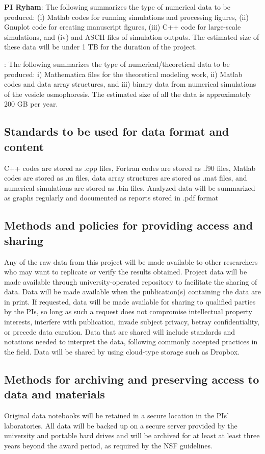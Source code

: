 \documentclass[11pt]{article}
\begin{document}
\noindent
{\bf PI Ryham}: The following summarizes the type of numerical data to
be produced: (i) Matlab codes for running simulations and processing
figures, (ii) Gnuplot code for creating manuscript figures, (iii) C++
code for large-scale simulations, and (iv) and ASCII files of simulation
outputs. The estimated size of these data will be under 1 TB for the
duration of the project.

: The following summarizes the type of
numerical/theoretical data to be produced: i) Mathematica files for the
theoretical modeling work, ii) Matlab codes and data array structures,
and iii) binary data from numerical simulations of the vesicle
osmophoresis. The estimated size of all the data is approximately 200 GB
per year. 

\subsection*{Standards to be used for data format and content}
C++ codes are stored as .cpp files, Fortran codes are stored as .f90
files, Matlab codes are stored as .m files, data array structures are
stored as .mat files, and numerical simulations are stored as .bin
files. Analyzed data will be summarized as graphs regularly and
documented as reports stored in .pdf format 

\subsection*{Methods and policies for providing access and sharing}
Any of the raw data from this project will be made available to other
researchers who may want to replicate or verify the results obtained.
Project data will be made available through university-operated
repository to facilitate the sharing of data. Data will be made
available when the publication(s) containing the data are in print. If
requested, data will be made available for sharing to qualified parties
by the PIs, so long as such a request does not compromise intellectual
property interests, interfere with publication, invade subject privacy,
betray confidentiality, or precede data curation. Data that are shared
will include standards and notations needed to interpret the data,
following commonly accepted practices in the field. Data will be shared
by using cloud-type storage such as Dropbox. 

\subsection*{Methods for archiving and preserving access to data and
materials}
Original data notebooks will be retained in a secure location in the
PIs' laboratories. All data will be backed up on a secure server
provided by the university and portable hard drives and will be archived
for at least at least three years beyond the award period, as required
by the NSF guidelines.
\end{document}
